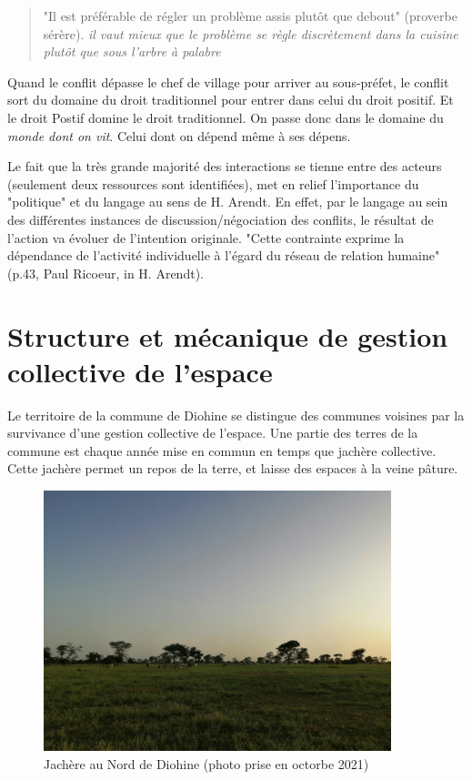 \begin{quote}
    "Il est préférable de régler un problème assis plutôt que debout" (proverbe sérère). \textit{il vaut mieux que le problème se règle discrètement dans la cuisine plutôt que sous l'arbre à palabre}
\end{quote}


Quand le conflit dépasse le chef de village pour arriver au sous-préfet, le conflit sort du domaine du droit traditionnel pour entrer dans celui du droit positif. Et le droit Postif domine le droit traditionnel. On passe donc dans le domaine du \textit{monde dont on vit}. Celui dont on dépend même à ses dépens.

Le fait que la très grande majorité des interactions se tienne  entre des  acteurs (seulement deux ressources sont identifiées), met en relief l'importance du "politique" et du langage au sens de H. Arendt\cite{arendt_condition_2020}. En effet, par le langage au sein des différentes instances de discussion/négociation des conflits, le résultat de l'action va évoluer de l'intention originale. "Cette contrainte exprime la dépendance de l'activité individuelle à l'égard du réseau de relation humaine" (p.43, Paul Ricoeur, in H. Arendt\cite{arendt_condition_2020}).

\section{Structure et mécanique de gestion collective de l'espace}

Le territoire de la commune de Diohine se distingue des communes voisines par la survivance d'une gestion collective de l'espace. Une partie des terres de la commune est chaque année mise en commun en temps que jachère collective. Cette jachère permet un repos de la terre, et laisse des espaces à la veine pâture.

\begin{figure}
  \begin{center}
    \includegraphics[width=0.9\textwidth]{img/jachere.jpg}
  \end{center}
  \caption{Jachère au Nord de Diohine (photo prise en octorbe 2021)}
  \label{fig:photoJachere}
\end{figure}

